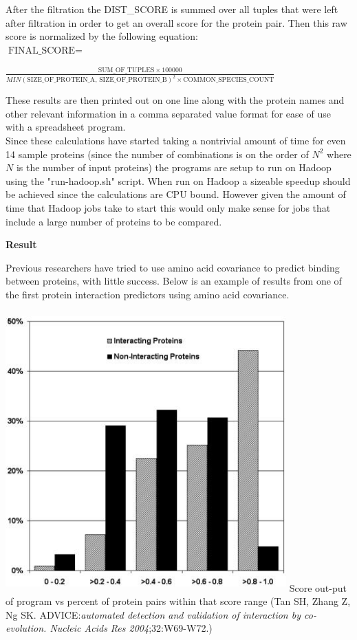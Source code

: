 \documentclass[11pt]{article}
\begin{document}
After the filtration the DIST\_SCORE is summed over all tuples that
were left after filtration in order to get an overall score for the
protein pair. Then this raw score is normalized by the following equation: \\

$\mbox{FINAL\_SCORE} = $ \\
\begin{center}
  $\frac{\mbox{SUM\_OF\_TUPLES} \times
    100000}{MIN(\mbox{SIZE\_OF\_PROTEIN\_A, SIZE\_OF\_PROTEIN\_B})^2
    \times \mbox{COMMON\_SPECIES\_COUNT}}$
\end{center}

These results are then printed out on one line along with the protein
names and other relevant information in a comma separated value format
for ease of use with a spreadsheet program. \\

Since these calculations have started taking a nontrivial amount of
time for even 14 sample proteins (since the number of combinations is
on the order of $N^2$ where $N$ is the number of input proteins) the
programs are setup to run on Hadoop using the "run-hadoop.sh"
script. When run on Hadoop a sizeable speedup should be achieved
since the calculations are CPU bound. However given the
amount of time that Hadoop jobs take to start this would only make
sense for jobs that include a large number of proteins to be compared.

\begin{center}
\textbf{Result}
\end{center}

Previous researchers have tried to use amino acid covariance to predict binding between proteins, with little success.  
Below is an example of results from one of the first protein interaction predictors using amino acid covariance.

\includegraphics[width=4.25in,height=4.25in]{hi.png}
Score out-put of program vs percent of protein pairs within that score range (Tan SH, Zhang Z, Ng SK. ADVICE:\emph{automated detection and validation of interaction by co-evolution. Nucleic Acids Res 2004};32:W69-W72.)\\
\end{document}
